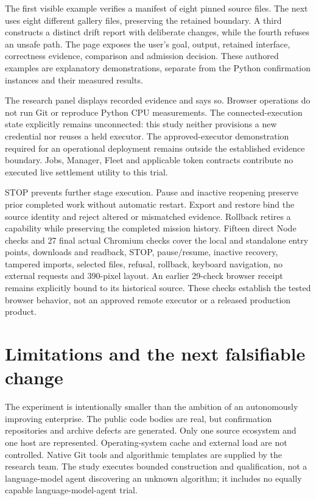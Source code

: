 \documentclass[11pt,a4paper]{article}
\begin{document}
The first visible example verifies a manifest of eight pinned source files. The next uses eight different gallery files, preserving the retained boundary. A third constructs a distinct drift report with deliberate changes, while the fourth refuses an unsafe path. The page exposes the user's goal, output, retained interface, correctness evidence, comparison and admission decision. These authored examples are explanatory demonstrations, separate from the Python confirmation instances and their measured results.

The research panel displays recorded evidence and says so. Browser operations do not run Git or reproduce Python CPU measurements. The connected-execution state explicitly remains unconnected: this study neither provisions a new credential nor reuses a held executor. The approved-executor demonstration required for an operational deployment remains outside the established evidence boundary. Jobs, Manager, Fleet and applicable token contracts contribute no executed live settlement utility to this trial.

STOP prevents further stage execution. Pause and inactive reopening preserve prior completed work without automatic restart. Export and restore bind the source identity and reject altered or mismatched evidence. Rollback retires a capability while preserving the completed mission history. Fifteen direct Node checks and 27 final actual Chromium checks cover the local and standalone entry points, downloads and readback, STOP, pause/resume, inactive recovery, tampered imports, selected files, refusal, rollback, keyboard navigation, no external requests and 390-pixel layout. An earlier 29-check browser receipt remains explicitly bound to its historical source. These checks establish the tested browser behavior, not an approved remote executor or a released production product.

\section{Limitations and the next falsifiable change}

The experiment is intentionally smaller than the ambition of an autonomously improving enterprise. The public code bodies are real, but confirmation repositories and archive defects are generated. Only one source ecosystem and one host are represented. Operating-system cache and external load are not controlled. Native Git tools and algorithmic templates are supplied by the research team. The study executes bounded construction and qualification, not a language-model agent discovering an unknown algorithm; it includes no equally capable language-model-agent trial.
\end{document}
